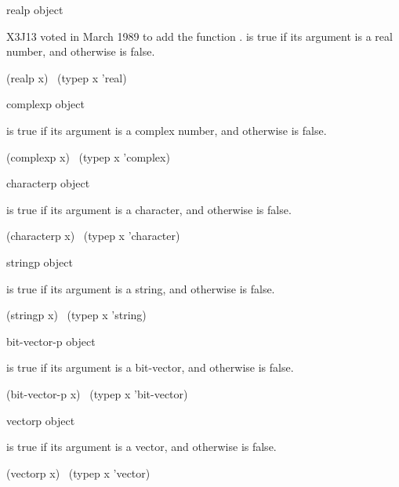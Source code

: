 \begin{newer}
\begin{defun}[Function]
realp object

X3J13 voted in March 1989  to add the function .
 is true if its argument is a real number,
and otherwise is false.
\begin{lisp}
(realp x) \EQ\ (typep x 'real)
\end{lisp}
\end{defun}
\end{newer}

\begin{defun}[Function]
complexp object

 is true if its argument is a complex number,
and otherwise is false.
\begin{lisp}
(complexp x) \EQ\ (typep x 'complex)
\end{lisp}
\end{defun}

\begin{defun}[Function]
characterp object

 is true if its argument is a character,
and otherwise is false.
\begin{lisp}
(characterp x) \EQ\ (typep x 'character)
\end{lisp}
\end{defun}

\begin{defun}[Function]
stringp object

 is true if its argument is a string,
and otherwise is false.
\begin{lisp}
(stringp x) \EQ\ (typep x 'string)
\end{lisp}
\end{defun}

\begin{defun}[Function]
bit-vector-p object

 is true if its argument is a bit-vector,
and otherwise is false.
\begin{lisp}
(bit-vector-p x) \EQ\ (typep x 'bit-vector)
\end{lisp}
\end{defun}

\begin{defun}[Function]
vectorp object

 is true if its argument is a vector,
and otherwise is false.
\begin{lisp}
(vectorp x) \EQ\ (typep x 'vector)
\end{lisp}
\end{defun}

